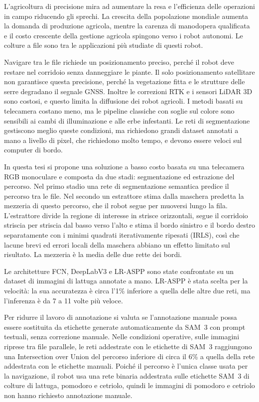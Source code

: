 L'agricoltura di precisione mira ad aumentare la resa e l'efficienza delle operazioni in campo riducendo gli sprechi. La crescita della popolazione mondiale aumenta la domanda di produzione agricola, mentre la carenza di manodopera qualificata e il costo crescente della gestione agricola spingono verso i robot autonomi. Le colture a file sono tra le applicazioni più studiate di questi robot.

Navigare tra le file richiede un posizionamento preciso, perché il robot deve restare nel corridoio senza danneggiare le piante. Il solo posizionamento satellitare non garantisce questa precisione, perché la vegetazione fitta e le strutture delle serre degradano il segnale GNSS. Inoltre le correzioni RTK e i sensori LiDAR 3D sono costosi, e questo limita la diffusione dei robot agricoli. I metodi basati su telecamera costano meno, ma le pipeline classiche con soglie sul colore sono sensibili ai cambi di illuminazione e alle erbe infestanti. Le reti di segmentazione gestiscono meglio queste condizioni, ma richiedono grandi dataset annotati a mano a livello di pixel, che richiedono molto tempo, e devono essere veloci sul computer di bordo.

In questa tesi si propone una soluzione a basso costo basata su una telecamera RGB monoculare e composta da due stadi: segmentazione ed estrazione del percorso. Nel primo stadio una rete di segmentazione semantica predice il percorso tra le file. Nel secondo un estrattore stima dalla maschera predetta la mezzeria di questo percorso, che il robot segue per muoversi lungo la fila. L'estrattore divide la regione di interesse in strisce orizzontali, segue il corridoio striscia per striscia dal basso verso l'alto e stima il bordo sinistro e il bordo destro separatamente con i minimi quadrati iterativamente ripesati (IRLS), così che lacune brevi ed errori locali della maschera abbiano un effetto limitato sul risultato. La mezzeria è la media delle due rette dei bordi.

Le architetture FCN, DeepLabV3 e LR-ASPP sono state confrontate su un dataset di immagini di lattuga annotate a mano. LR-ASPP è stata scelta per la velocità: la sua accuratezza è circa l'1\% inferiore a quella delle altre due reti, ma l'inferenza è da 7 a 11 volte più veloce.

Per ridurre il lavoro di annotazione si valuta se l'annotazione manuale possa essere sostituita da etichette generate automaticamente da SAM~3 con prompt testuali, senza correzione manuale. Nelle condizioni operative, sulle immagini riprese tra file parallele, le reti addestrate con le etichette di SAM~3 raggiungono una Intersection over Union del percorso inferiore di circa il 6\% a quella della rete addestrata con le etichette manuali. Poiché il percorso è l'unica classe usata per la navigazione, il robot usa una rete binaria addestrata sulle etichette SAM~3 di colture di lattuga, pomodoro e cetriolo, quindi le immagini di pomodoro e cetriolo non hanno richiesto annotazione manuale.

